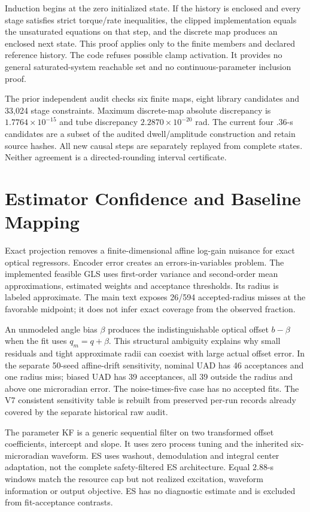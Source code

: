\documentclass[10pt,journal]{IEEEtran}
\begin{document}
Induction begins at the zero initialized state. If the history is enclosed and every stage satisfies strict torque/rate inequalities, the clipped implementation equals the unsaturated equations on that step, and the discrete map produces an enclosed next state. This proof applies only to the finite members and declared reference history. The code refuses possible clamp activation. It provides no general saturated-system reachable set and no continuous-parameter inclusion proof.

The prior independent audit checks six finite maps, eight library candidates and 33,024 stage constraints. Maximum discrete-map absolute discrepancy is $1.7764\times10^{-15}$ and tube discrepancy $2.2870\times10^{-20}$ rad. The current four .36-s candidates are a subset of the audited dwell/amplitude construction and retain source hashes. All new causal steps are separately replayed from complete states. Neither agreement is a directed-rounding interval certificate.

\section{Estimator Confidence and Baseline Mapping}
Exact projection removes a finite-dimensional affine log-gain nuisance for exact optical regressors. Encoder error creates an errors-in-variables problem. The implemented feasible GLS uses first-order variance and second-order mean approximations, estimated weights and acceptance thresholds. Its radius is labeled approximate. The main text exposes 26/594 accepted-radius misses at the favorable midpoint; it does not infer exact coverage from the observed fraction.

An unmodeled angle bias $\beta$ produces the indistinguishable optical offset $b-\beta$ when the fit uses $q_m=q+\beta$. This structural ambiguity explains why small residuals and tight approximate radii can coexist with large actual offset error. In the separate 50-seed affine-drift sensitivity, nominal UAD has 46 acceptances and one radius miss; biased UAD has 39 acceptances, all 39 outside the radius and above one microradian error. The noise-times-five case has no accepted fits. The V7 consistent sensitivity table is rebuilt from preserved per-run records already covered by the separate historical raw audit.

The parameter KF is a generic sequential filter on two transformed offset coefficients, intercept and slope. It uses zero process tuning and the inherited six-microradian waveform. ES uses washout, demodulation and integral center adaptation, not the complete safety-filtered ES architecture. Equal 2.88-s windows match the resource cap but not realized excitation, waveform information or output objective. ES has no diagnostic estimate and is excluded from fit-acceptance contrasts.
\end{document}
